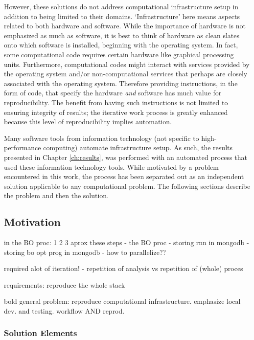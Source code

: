 However, these solutions do not address computational infrastructure setup in addition to being limited to their domains.
%
`Infrastructure' here means aspects related to both hardware and software.
%
While the importance of hardware is not emphasized as much as software, it is best to think of hardware as clean slates onto which software is installed, beginning with the operating system.
%
In fact, some computational code requires certain hardware like graphical processing units.
%
Furthermore, computational codes might interact with services provided by the operating system and/or non-computational services that perhaps are closely associated with the operating system.
%
Therefore providing instructions, in the form of code, that specify the hardware \emph{and} software has much value for reproducibility.
%
The benefit from having such instructions is not limited to ensuring integrity of results;
%
the iterative work process is greatly enhanced because this level of reproducibility implies automation.


Many software tools from information technology (not specific to high-performance computing) automate infrastructure setup.
%
As such, the results presented in Chapter \ref{ch:results}, was performed with an automated process that used these information technology tools.
%
While motivated by a problem encountered in this work, the process has been separated out as an independent solution applicable to any computational problem.
%
The following sections describe the problem and then the solution.


\subsection{Motivation}


in the BO proc: 1 2 3 aprox these steps
- the BO proc
- storing rnn in mongodb
- storing bo opt prog in mongodb
- how to parallelize??


required alot of iteration!
- repetition of analysis vs repetition of (whole) proces

requirements: reproduce the whole stack

bold general problem: reproduce computational infrastructure. emphasize local dev. and testing. workflow AND reprod.



\subsubsection{Solution Elements}

